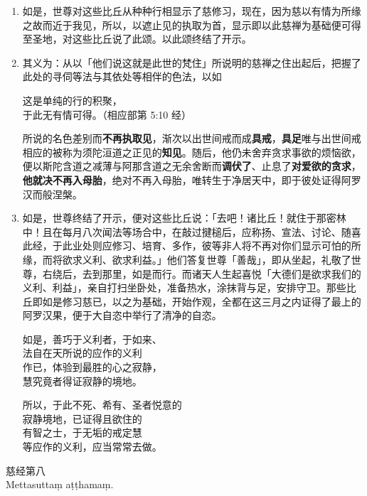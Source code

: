 \begin{enumerate}\item 如是，世尊对这些比丘从种种行相显示了慈修习，现在，因为慈以有情为所缘之故而近于我见，所以，以遮止见的执取为首，显示即以此慈禅为基础便可得至圣地，对这些比丘说了此颂。以此颂终结了开示。
\item 其义为：从以「他们说这就是此世的梵住」所说明的慈禅之住出起后，把握了此处的寻伺等法与其依处等相伴的色法，以如\begin{quoting}这是单纯的行的积聚，\\于此无有情可得。（相应部第 5:10 经）\end{quoting}所说的名色差别而\textbf{不再执取见}，渐次以出世间戒而成\textbf{具戒}，\textbf{具足}唯与出世间戒相应的被称为须陀洹道之正见的\textbf{知见}。随后，他仍未舍弃贪求事欲的烦恼欲，便以斯陀含道之减薄与阿那含道之无余舍断而\textbf{调伏了}、止息了\textbf{对爱欲的贪求}，\textbf{他就决不再入母胎}，绝对不再入母胎，唯转生于净居天中，即于彼处证得阿罗汉而般涅槃。
\item 如是，世尊终结了开示，便对这些比丘说：「去吧！诸比丘！就住于那密林中！且在每月八次闻法等场合中，在敲过揵槌后，应称扬、宣法、讨论、随喜此经，于此业处则应修习、培育、多作，彼等非人将不再对你们显示可怕的所缘，而将欲求义利、欲求利益。」他们答复世尊「善哉」，即从坐起，礼敬了世尊，右绕后，去到那里，如是而行。而诸天人生起喜悦「大德们是欲求我们的义利、利益」，亲自打扫坐卧处，准备热水，涂抹背与足，安排守卫。那些比丘即如是修习慈已，以之为基础，开始作观，全都在这三月之内证得了最上的阿罗汉果，便于大自恣中举行了清净的自恣。\begin{quoting}如是，善巧于义利者，于如来、\\法自在天所说的应作的义利\\作已，体验到最胜的心之寂静，\\慧究竟者得证寂静的境地。\end{quoting}\begin{quoting}所以，于此不死、希有、圣者悦意的\\寂静境地，已证得且欲住的\\有智之士，于无垢的戒定慧\\等应作的义利，应当常常去做。\end{quoting}\end{enumerate}

\begin{center}\vspace{1em}慈经第八\\Mettasuttaṃ aṭṭhamaṃ.\end{center}

